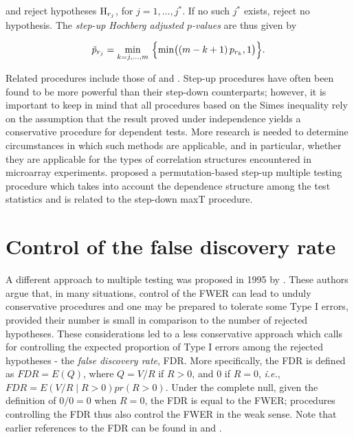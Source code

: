 \documentclass[11pt]{article}
\newcommand{\scst}{\scriptstyle}
\begin{document}
and reject hypotheses ${\rm H}_{\scst r_j}$, for $j=1,\ldots,j^*$. If no such $j^*$ exists, reject no hypothesis. The {\it step-up Hochberg adjusted $p$-values} are thus given by 

\begin{equation}\label{ehoch}
\tilde{p}_{\scst r_j} = \min_{k = j,\ldots, m}\ \Bigl\{ \min \bigl( (m-k+1) \, p_{\scst r_k},1 \bigr) \Bigr\}.
\end{equation}

Related procedures include those of \cite{Hommel88} and \cite{Rom90}. Step-up procedures have often been found to be more powerful than their step-down counterparts; however, it is important to keep in mind that all procedures based on the Simes inequality rely on the assumption that the result proved under independence yields a conservative procedure for dependent tests. More research is needed to determine circumstances in which such methods are applicable, and in particular, whether they are applicable for the types of correlation structures encountered in microarray experiments. \cite{Troendle96} proposed a permutation-based step-up multiple testing procedure which takes into account the dependence structure among the test statistics and is related to the \cite{Westfall&Young93} step-down maxT procedure.



\section{Control of the false discovery rate}\label{sFDR}

A different approach to multiple testing was proposed in 1995 by
\cite{Benjamini&Hochberg95}. These authors argue that, in many
situations, control of the FWER can lead to unduly conservative
procedures and one may be prepared to tolerate some Type I
errors, provided their number is small in comparison to the number of
rejected hypotheses. These considerations led to a less conservative
approach which calls for controlling the expected proportion of Type I
errors among the rejected hypotheses - the {\it false discovery rate},
FDR. More specifically, the FDR is defined as $FDR = E(Q)$, where $Q =
V/R$ if $R >0$, and $0$ if $R=0$, {\it i.e.}, $FDR = E(V/R \mid
R>0)pr(R>0)$. Under the complete null, given the definition of $0/0 =
0$ when $R=0$, the FDR is equal to the FWER;  procedures
controlling the FDR thus also control the FWER in the weak sense. Note that
earlier references to the FDR can be found in \cite{Seeger68} and \cite{Soric89}.\\
\end{document}
